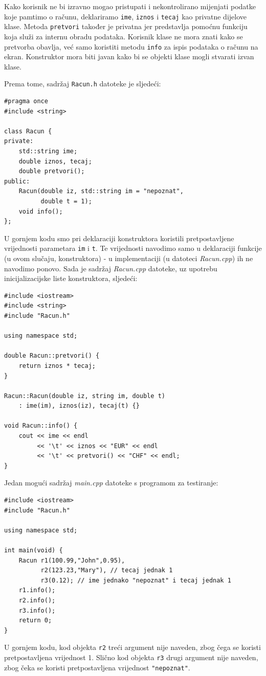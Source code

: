 \begin{rjesenje}
Kako korisnik ne bi izravno mogao pristupati i nekontrolirano mijenjati
podatke koje pamtimo o računu,
deklariramo \texttt{ime}, \texttt{iznos} i \texttt{tecaj}
kao privatne dijelove klase.
Metoda \texttt{pretvori} također je privatna jer predstavlja pomoćnu funkciju koja služi za internu obradu podataka. Korisnik klase ne mora znati kako se pretvorba obavlja, već samo koristiti 
metodu \texttt{info} za ispis podataka o računu na ekran.
Konstruktor mora biti javan kako bi se objekti klase mogli stvarati izvan klase.
\medskip

Prema tome, sadržaj \texttt{Racun.h} datoteke je sljedeći:

\begin{verbatim}
#pragma once
#include <string>

class Racun {
private:
    std::string ime;
    double iznos, tecaj;
    double pretvori();
public:
    Racun(double iz, std::string im = "nepoznat",
          double t = 1);
    void info();
};
\end{verbatim}

U gornjem kodu smo pri deklaraciji konstruktora koristili pretpostavljene vrijednosti parametara 
\texttt{im} i \texttt{t}.
Te vrijednosti navodimo samo u deklaraciji funkcije
(u ovom slučaju, konstruktora) - u implementaciji
(u datoteci \textit{Racun.cpp}) ih ne navodimo ponovo.
Sada je sadržaj \textit{Racun.cpp} datoteke,
uz upotrebu inicijalizacijske liste konstruktora, sljedeći:

\begin{verbatim}
#include <iostream>
#include <string>
#include "Racun.h"

using namespace std;

double Racun::pretvori() {
	return iznos * tecaj;
}

Racun::Racun(double iz, string im, double t) 
    : ime(im), iznos(iz), tecaj(t) {}

void Racun::info() {
    cout << ime << endl 
         << '\t' << iznos << "EUR" << endl
         << '\t' << pretvori() << "CHF" << endl;
}
\end{verbatim}


Jedan mogući sadržaj \textit{main.cpp} datoteke s programom za testiranje:

\begin{verbatim}
#include <iostream>
#include "Racun.h"

using namespace std;

int main(void) {
    Racun r1(100.99,"John",0.95),
          r2(123.23,"Mary"), // tecaj jednak 1 
          r3(0.12); // ime jednako "nepoznat" i tecaj jednak 1
    r1.info();
    r2.info();
    r3.info();
    return 0;
}
\end{verbatim}

U gornjem kodu, kod objekta \texttt{r2} treći argument nije naveden, zbog čega se koristi pretpostavljena vrijednost 1.
Slično kod objekta \texttt{r3} drugi argument nije naveden,
zbog čeka se koristi pretpostavljena vrijednost \texttt{"nepoznat"}.
\end{rjesenje}


